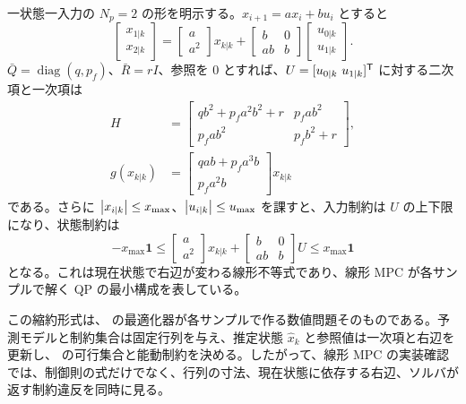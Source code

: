 一状態一入力の $N_p=2$ の形を明示する。$x_{i+1}=ax_i+bu_i$ とすると
\begin{equation}
  \begin{bmatrix}x_{1|k}\\x_{2|k}\end{bmatrix}
  =
  \begin{bmatrix}a\\a^2\end{bmatrix}x_{k|k}
  +
  \begin{bmatrix}
    b&0\\
    ab&b
  \end{bmatrix}
  \begin{bmatrix}u_{0|k}\\u_{1|k}\end{bmatrix}.
\end{equation}
$\bar{Q}=\operatorname{diag}(q,p_f)$、$\bar{R}=rI$、参照を 0 とすれば、$U=[u_{0|k}\ u_{1|k}]^{\mathsf{T}}$ に対する二次項と一次項は
\begin{align}
  H&=
  \begin{bmatrix}
    qb^2+p_fa^2b^2+r & p_fab^2\\
    p_fab^2 & p_fb^2+r
  \end{bmatrix},\\
  g(x_{k|k})&=
  \begin{bmatrix}
    qab+p_fa^3b\\
    p_fa^2b
  \end{bmatrix}x_{k|k}
\end{align}
である。さらに $\left|x_{i|k}\right|\le x_{\max}$、$\left|u_{i|k}\right|\le u_{\max}$ を課すと、入力制約は $U$ の上下限になり、状態制約は
\begin{equation}
  -x_{\max}\mathbf{1}
  \le
  \begin{bmatrix}a\\a^2\end{bmatrix}x_{k|k}
  +
  \begin{bmatrix}
    b&0\\
    ab&b
  \end{bmatrix}U
  \le
  x_{\max}\mathbf{1}
\end{equation}
となる。これは現在状態で右辺が変わる線形不等式であり、線形 MPC が各サンプルで解く QP の最小構成を表している。

この縮約形式は、 の最適化器が各サンプルで作る数値問題そのものである。予測モデルと制約集合は固定行列を与え、推定状態 $\hat{x}_k$ と参照値は一次項と右辺を更新し、 の可行集合と能動制約を決める。したがって、線形 MPC の実装確認では、制御則の式だけでなく、行列の寸法、現在状態に依存する右辺、ソルバが返す制約違反を同時に見る。


